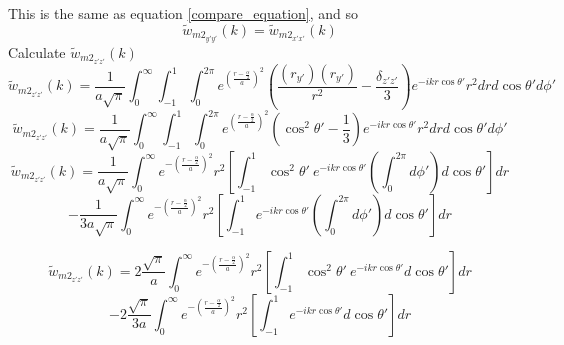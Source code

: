 \documentclass[letterpaper,twocolumn,amsmath,amssymb,prb]{revtex4-1}
\begin{document}
\begin{widetext}
This is the same as equation \ref{compare_equation}, and so \begin{equation}{\widetilde{w}_{{m2}_{y'y'}}(k)=\widetilde{w}_{{m2}_{x'x'}}(k)}\end{equation}
Calculate $\widetilde{w}_{{m2}_{z'z'}}(k)$ 
\begin{equation}{\widetilde{w}_{{m2}_{z'z'}}(k)=\frac{1}{a\sqrt{\pi}}\int_{0}^{\infty}\int_{-1}^{1}\int_{0}^{2\pi}e^{\left(\frac{r-\frac{\alpha}{2}}{a}\right)^2}\left(\frac{(r_{y'})(r_{y'})}{r^2}-\frac{\delta_{z'z'}}{3}\right)e^{-ikr\cos\theta'}r^2d{r}d{\cos\theta'}d{\phi'}}\end{equation}
\begin{equation}{\widetilde{w}_{{m2}_{z'z'}}(k)=\frac{1}{a\sqrt{\pi}}\int_{0}^{\infty}\int_{-1}^{1}\int_{0}^{2\pi}e^{\left(\frac{r-\frac{\alpha}{2}}{a}\right)^2}\left(\cos^2\theta'-\frac{1}{3}\right)e^{-ikr\cos\theta'}r^2d{r}d{\cos\theta'}d{\phi'}}\end{equation}
\[{}\]
\begin{displaymath}{\widetilde{w}_{{m2}_{z'z'}}(k)=\frac{1}{a\sqrt{\pi}}\int_{0}^{\infty}e^{-\left(\frac{r-\frac{\alpha}{2}}{a}\right)^2}r^2\left[\int_{-1}^{1}\cos^2\theta'~e^{-ikr\cos\theta'}\left(\int_{0}^{2\pi}d{\phi'}\right)d{\cos\theta'}\right]d{r}}\end{displaymath} 
\begin{equation}{-\frac{1}{3a\sqrt{\pi}}\int_{0}^{\infty}e^{-\left(\frac{r-\frac{\alpha}{2}}{a}\right)^2}r^2\left[\int_{-1}^{1}e^{-ikr\cos\theta'}\left(\int_{0}^{2\pi}d{\phi'}\right)d{\cos\theta'}\right]d{r}}\end{equation}

\color{blue}
\begin{displaymath}{\widetilde{w}_{{m2}_{z'z'}}(k)=2\frac{\sqrt{\pi}}{a}\int_{0}^{\infty}e^{-\left(\frac{r-\frac{\alpha}{2}}{a}\right)^2}r^2\left[\int_{-1}^{1}\cos^2\theta'~e^{-ikr\cos\theta'}d{\cos\theta'}\right]d{r}}\end{displaymath} 
\begin{equation}{-2\frac{\sqrt{\pi}}{3a}\int_{0}^{\infty}e^{-\left(\frac{r-\frac{\alpha}{2}}{a}\right)^2}r^2\left[\int_{-1}^{1}e^{-ikr\cos\theta'}d{\cos\theta'}\right]d{r}}\end{equation}
\color{black} 





\end{widetext}
\end{document}

